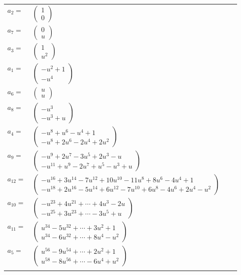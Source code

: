 \documentclass[1p]{elsarticle_modified}
\theoremstyle{definition}
\begin{document}
\begin{tabular}{m{7pt} m{180pt} m{7pt} m{180pt} }
\flushright $a_{2}=$&$\begin{pmatrix}1\\0\end{pmatrix}$ \\
\flushright $a_{7}=$&$\begin{pmatrix}0\\u\end{pmatrix}$ \\
\flushright $a_{3}=$&$\begin{pmatrix}1\\u^2\end{pmatrix}$ \\
\flushright $a_{1}=$&$\begin{pmatrix}- u^2+1\\- u^4\end{pmatrix}$ \\
\flushright $a_{6}=$&$\begin{pmatrix}u\\u\end{pmatrix}$ \\
\flushright $a_{8}=$&$\begin{pmatrix}- u^3\\- u^3+u\end{pmatrix}$ \\
\flushright $a_{4}=$&$\begin{pmatrix}- u^8+u^6- u^4+1\\- u^8+2 u^6-2 u^4+2 u^2\end{pmatrix}$ \\
\flushright $a_{9}=$&$\begin{pmatrix}- u^9+2 u^7-3 u^5+2 u^3- u\\- u^{11}+u^9-2 u^7+u^5- u^3+u\end{pmatrix}$ \\
\flushright $a_{12}=$&$\begin{pmatrix}- u^{16}+3 u^{14}-7 u^{12}+10 u^{10}-11 u^8+8 u^6-4 u^4+1\\- u^{18}+2 u^{16}-5 u^{14}+6 u^{12}-7 u^{10}+6 u^8-4 u^6+2 u^4- u^2\end{pmatrix}$ \\
\flushright $a_{10}=$&$\begin{pmatrix}- u^{23}+4 u^{21}+\cdots+4 u^3-2 u\\- u^{25}+3 u^{23}+\cdots-3 u^5+u\end{pmatrix}$ \\
\flushright $a_{11}=$&$\begin{pmatrix}u^{34}-5 u^{32}+\cdots+3 u^2+1\\u^{34}-6 u^{32}+\cdots+8 u^4- u^2\end{pmatrix}$ \\
\flushright $a_{5}=$&$\begin{pmatrix}u^{56}-9 u^{54}+\cdots+2 u^2+1\\u^{58}-8 u^{56}+\cdots-6 u^4+u^2\end{pmatrix}$\\&\end{tabular}
\end{document}
